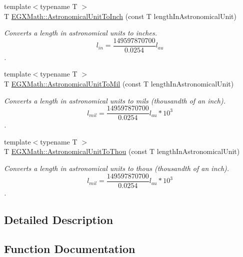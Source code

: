 \begin{DoxyCompactItemize}
{\footnotesize template$<$typename T $>$ }\\T \mbox{\hyperlink{group___e_g_x_math-_conversions-_length_conversions-_astronomical-_astronomical_unit-_imperial_ga75ba3ea9f789b7d12627bc67e4a4e904}{E\+G\+X\+Math\+::\+Astronomical\+Unit\+To\+Inch}} (const T length\+In\+Astronomical\+Unit)
\begin{DoxyCompactList}\small\item\em Converts a length in astronomical units to inches. \[ l_{in}= \frac{149597870700}{0.0254} l_{au} \]. \end{DoxyCompactList}\item 
{\footnotesize template$<$typename T $>$ }\\T \mbox{\hyperlink{group___e_g_x_math-_conversions-_length_conversions-_astronomical-_astronomical_unit-_imperial_ga5a4de19a0aa243fb3b3ea8e014f7c574}{E\+G\+X\+Math\+::\+Astronomical\+Unit\+To\+Mil}} (const T length\+In\+Astronomical\+Unit)
\begin{DoxyCompactList}\small\item\em Converts a length in astronomical units to mils (thousandth of an inch). \[ l_{mil}= \frac{149597870700}{0.0254} l_{au} * 10^{3} \]. \end{DoxyCompactList}\item 
{\footnotesize template$<$typename T $>$ }\\T \mbox{\hyperlink{group___e_g_x_math-_conversions-_length_conversions-_astronomical-_astronomical_unit-_imperial_ga6c8f186a4c27fd488b82e76d8e27f8a8}{E\+G\+X\+Math\+::\+Astronomical\+Unit\+To\+Thou}} (const T length\+In\+Astronomical\+Unit)
\begin{DoxyCompactList}\small\item\em Converts a length in astronomical units to thous (thousandth of an inch). \[ l_{mil}= \frac{149597870700}{0.0254} l_{au} * 10^{3} \]. \end{DoxyCompactList}\end{DoxyCompactItemize}


\subsection{Detailed Description}


\subsection{Function Documentation}
\mbox{\label{group___e_g_x_math-_conversions-_length_conversions-_astronomical-_astronomical_unit-_imperial_ga09db4693d70e24b3a933582badf882af}} 
